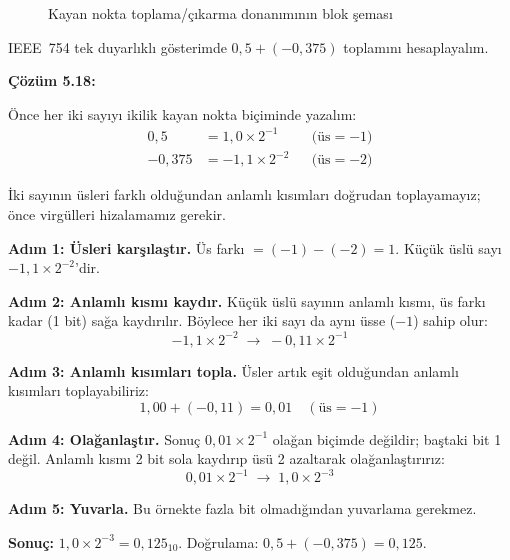 \begin{figure}[htbp]
\caption{Kayan nokta toplama/çıkarma donanımının blok şeması}
\label{fig:kayan-nokta-toplama-donanim}
\end{figure}

\FloatBarrier
\begin{ornek}[5.18]
IEEE~754 tek duyarlıklı gösterimde $0{,}5 + (-0{,}375)$ toplamını hesaplayalım.

\textbf{Çözüm 5.18:}

Önce her iki sayıyı ikilik kayan nokta biçiminde yazalım:
\begin{align*}
0{,}5  &= 1{,}0 \times 2^{-1}  &&\text{(üs} = -1\text{)} \\
-0{,}375 &= -1{,}1 \times 2^{-2} &&\text{(üs} = -2\text{)}
\end{align*}

İki sayının üsleri farklı olduğundan anlamlı kısımları doğrudan toplayamayız; önce virgülleri hizalamamız gerekir.

\textbf{Adım 1: Üsleri karşılaştır.} Üs farkı $= (-1) - (-2) = 1$. Küçük üslü sayı $-1{,}1 \times 2^{-2}$'dir.

\textbf{Adım 2: Anlamlı kısmı kaydır.} Küçük üslü sayının anlamlı kısmı, üs farkı kadar (1 bit) sağa kaydırılır. Böylece her iki sayı da aynı üsse ($-1$) sahip olur:
\[
-1{,}1 \times 2^{-2} \;\longrightarrow\; -0{,}11 \times 2^{-1}
\]

\textbf{Adım 3: Anlamlı kısımları topla.} Üsler artık eşit olduğundan anlamlı kısımları toplayabiliriz:
\[
1{,}00 + (-0{,}11) = 0{,}01 \quad (\text{üs} = -1)
\]

\textbf{Adım 4: Olağanlaştır.} Sonuç $0{,}01 \times 2^{-1}$ olağan biçimde değildir; baştaki bit 1 değil. Anlamlı kısmı 2 bit sola kaydırıp üsü 2 azaltarak olağanlaştırırız:
\[
0{,}01 \times 2^{-1} \;\longrightarrow\; 1{,}0 \times 2^{-3}
\]

\textbf{Adım 5: Yuvarla.} Bu örnekte fazla bit olmadığından yuvarlama gerekmez.

\textbf{Sonuç:} $1{,}0 \times 2^{-3} = 0{,}125_{10}$. Doğrulama: $0{,}5 + (-0{,}375) = 0{,}125$. \checkmark
\end{ornek}

